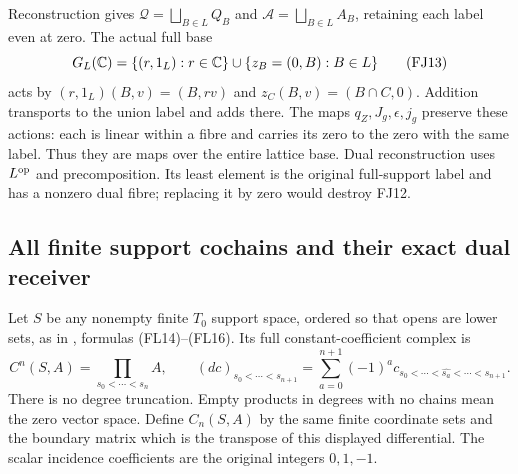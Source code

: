 Reconstruction gives $\mathcal Q=\bigsqcup_{B\in L}Q_B$ and
$\mathcal A=\bigsqcup_{B\in L}A_B$, retaining each label even at zero.
The actual full base
\[
 G_L(\mathbb C)=\{(r,1_L):r\in\mathbb C\}\cup\{z_B=(0,B):B\in L\}
 \tag{FJ13}
\]
acts by $(r,1_L)(B,v)=(B,rv)$ and
$z_C(B,v)=(B\cap C,0)$. Addition transports to the union label
and adds there. The maps $q_Z,J_g,\epsilon,j_g$ preserve these actions:
each is linear within a fibre and carries its zero to the zero with
the same label. Thus they are maps over the entire lattice base.
Dual reconstruction uses $L^{\rm op}$ and precomposition. Its least
element is the original full-support label and has a nonzero dual
fibre; replacing it by zero would destroy FJ12.

\subsection{All finite support cochains and their exact dual receiver}
Let $S$ be any nonempty finite $T_0$ support space, ordered so that
opens are lower sets, as in \cite{FJsupport}, formulas
(FL14)--(FL16). Its full constant-coefficient complex is
\[
 C^n(S,A)=\prod_{s_0<\cdots<s_n}A,\qquad
 (dc)_{s_0<\cdots<s_{n+1}}
   =\sum_{a=0}^{n+1}(-1)^ac_{s_0<\cdots<\widehat{s_a}<\cdots<s_{n+1}}.
 \tag{FJ14}\label{fj:fj:support}
\]
There is no degree truncation. Empty products in degrees with no
chains mean the zero vector space. Define $C_n(S,A)$ by the same
finite coordinate sets and the boundary matrix which is the transpose
of this displayed differential. The scalar incidence coefficients
are the original integers $0,1,-1$.

